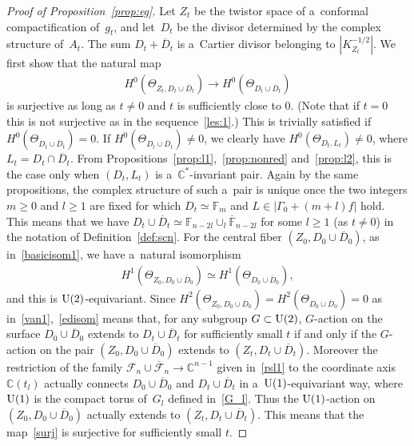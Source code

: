 \documentclass[pdftex]{sigma}
\numberwithin{equation}{section}
\begin{document}
\begin{proof}[Proof of Proposition~\ref{prop:eg}] Let $Z_t$ be the twistor space of a~conformal compactif\/ication of~$g_t$, and
let~$D_t$ be the divisor determined by the complex structure of~$A_t$.
The sum $D_t+\overline D_t$ is a~Cartier divisor belonging to $|K_{Z_t}^{-1/2}|$.
We f\/irst show that the natural map
\begin{gather}
\label{surj}
H^0(\Theta_{Z_t,D_t\cup\overline D_t})
\longrightarrow
H^0(\Theta_{D_t\cup\overline D_t})
\end{gather}
is surjective as long as $t\neq 0$ and $t$ is suf\/f\/iciently close to $0$.
(Note that if $t=0$ this is not surjective as in the sequence~\eqref{les:1}.) This is trivially satisf\/ied if
$H^0(\Theta_{D_t\cup\overline D_t}) = 0$.
If $H^0(\Theta_{D_t\cup\overline D_t}) \neq 0$, we clearly have $H^0(\Theta_{D_t,L_t}) \neq 0$, where
$L_t=D_t\cap\overline D_t$.
From Propositions~\ref{prop:l1},~\ref{prop:nonred} and~\ref{prop:l2}, this is the case only when $(D_t,L_t)$ is
a~$\mathbb{C}^*$-invariant pair.
Again by the same propositions, the complex structure of such a~pair is unique once the two integers $m\ge 0$ and $l\ge
1$ are f\/ixed for which $D_t\simeq\mathbb{F}_m$ and $L\in |\Gamma_0 + (m+l)f|$ hold.
This means that we have $D_t\cup \overline D_t\simeq \mathbb{F}_{n-2l}\cup_l\overline{\mathbb{F}}_{n-2l}$ for some $l\ge
1$ (as $t\neq 0$) in the notation of Def\/inition~\ref{def:scn}.
For the central f\/iber $(Z_0,D_0\cup\overline D_0)$, as in~\eqref{basicisom1}, we have a~natural isomorphism
\begin{gather}
\label{edisom}
H^1( \Theta_{Z_0,D_0\cup\overline D_0}) \simeq H^1(\Theta_{D_0\cup\overline D_0}),
\end{gather}
and this is ${\rm{U}}(2)$-equivariant.
Since $H^2( \Theta_{Z_0,D_0\cup\overline D_0}) = H^2(\Theta_{D_0\cup\overline D_0})=0$ as
in~\eqref{van1},~\eqref{edisom} means that, for any subgroup $G\subset {\rm{U}}(2)$, $G$-action on the surface
$D_0\cup\overline D_0$ extends to $D_t\cup\overline D_t$ for suf\/f\/iciently small $t$ if and only if the $G$-action on
the pair $(Z_0,D_0\cup\overline D_0)$ extends to $(Z_t,D_t\cup\overline D_t)$.
Moreover the restriction of the family $\mathscr F_n\cup\overline{\mathscr F}_n\to\mathbb{C}^{n-1}$ given
in~\eqref{rsl1} to the coordinate axis~$\mathbb{C}(t_l)$ actually connects $D_0\cup\overline D_0$ and $D_t\cup\overline
D_t$ in a~${\rm{U}}(1)$-equivariant way, where ${\rm{U}}(1)$ is the compact torus of~$G_l$ def\/ined in~\eqref{G_l}.
Thus the ${\rm{U}}(1)$-action on $(Z_0,D_0\cup\overline D_0)$ actually extends to $(Z_t,D_t\cup\overline D_t)$.
This means that the map~\eqref{surj} is surjective for suf\/f\/iciently small $t$.


\end{proof}
\end{document}
